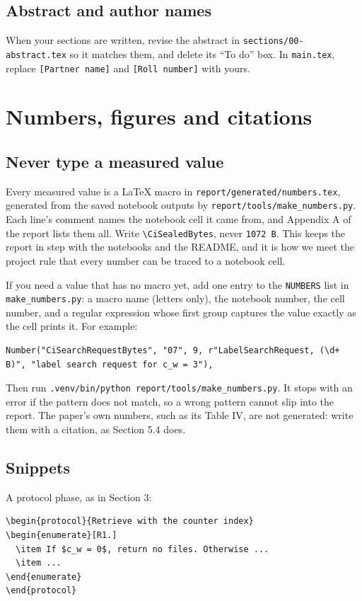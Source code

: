 \documentclass[11pt,a4paper]{article}
\newcommand{\file}[1]{\texttt{#1}}
\begin{document}
\subsection{Abstract and author names}

When your sections are written, revise the abstract in \file{sections/00-abstract.tex} so it matches them, and
delete its ``To do'' box. In \file{main.tex}, replace \verb|[Partner name]| and \verb|[Roll number]| with yours.

\section{Numbers, figures and citations}

\subsection{Never type a measured value}

Every measured value is a LaTeX macro in \file{report/generated/numbers.tex}, generated from the saved notebook
outputs by \file{report/tools/make\_numbers.py}. Each line's comment names the notebook cell it came from, and
Appendix A of the report lists them all. Write \verb|\CiSealedBytes|, never \verb|1072 B|. This keeps the report
in step with the notebooks and the README, and it is how we meet the project rule that every number can be traced
to a notebook cell.

If you need a value that has no macro yet, add one entry to the \texttt{NUMBERS} list in
\file{make\_numbers.py}: a macro name (letters only), the notebook number, the cell number, and a regular
expression whose first group captures the value exactly as the cell prints it. For example:
\begin{lstlisting}
Number("CiSearchRequestBytes", "07", 9, r"LabelSearchRequest, (\d+ B)", "label search request for c_w = 3"),
\end{lstlisting}
Then run \file{.venv/bin/python report/tools/make\_numbers.py}. It stops with an error if the pattern does not
match, so a wrong pattern cannot slip into the report. The paper's own numbers, such as its Table IV, are not
generated: write them with a citation, as Section 5.4 does.

\subsection{Snippets}
\label{sec:snippets}

A protocol phase, as in Section 3:
\begin{lstlisting}
\begin{protocol}{Retrieve with the counter index}
\begin{enumerate}[R1.]
  \item If $c_w = 0$, return no files. Otherwise ...
  \item ...
\end{enumerate}
\end{protocol}
\end{lstlisting}
\end{document}
